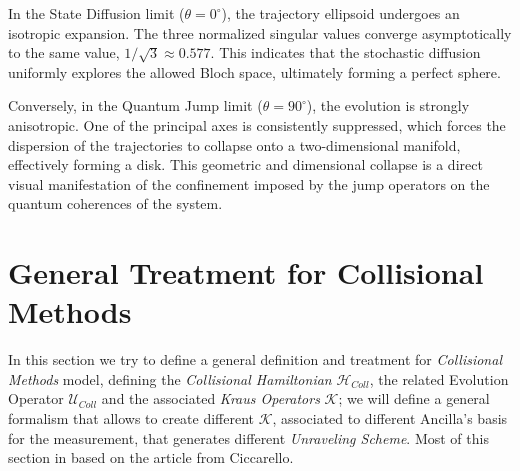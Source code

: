 \documentclass[a4paper,12pt]{article}
\begin{document}
In the State Diffusion limit ($\theta = 0^\circ$), the trajectory ellipsoid undergoes an isotropic expansion. The three normalized singular values converge asymptotically to the same value, $1/\sqrt{3} \approx 0.577$. This indicates that the stochastic diffusion uniformly explores the allowed Bloch space, ultimately forming a perfect sphere.

Conversely, in the Quantum Jump limit ($\theta = 90^\circ$), the evolution is strongly anisotropic. One of the principal axes is consistently suppressed, which forces the dispersion of the trajectories to collapse onto a two-dimensional manifold, effectively forming a disk. This geometric and dimensional collapse is a direct visual manifestation of the confinement imposed by the jump operators on the quantum coherences of the system.

\newpage

\section{General Treatment for Collisional Methods}
\label{sec:General_Treatment_for_Collisional Methods}

In this section we try to define a general definition and treatment for \textit{Collisional Methods} model, defining the \textit{Collisional Hamiltonian} $ \mathcal{H}_{Coll} $, the related Evolution Operator $ \mathcal{U}_{Coll} $ and the associated \textit{Kraus Operators} $ \mathcal{K} $; we will define a general formalism that allows to create different $ \mathcal{K} $, associated to different Ancilla's basis for the measurement, that generates different \textit{Unraveling Scheme}. \newline
Most of this section in based on the article from Ciccarello\cite{ciccarelloQuantumCollisionModels2022}.
\end{document}
